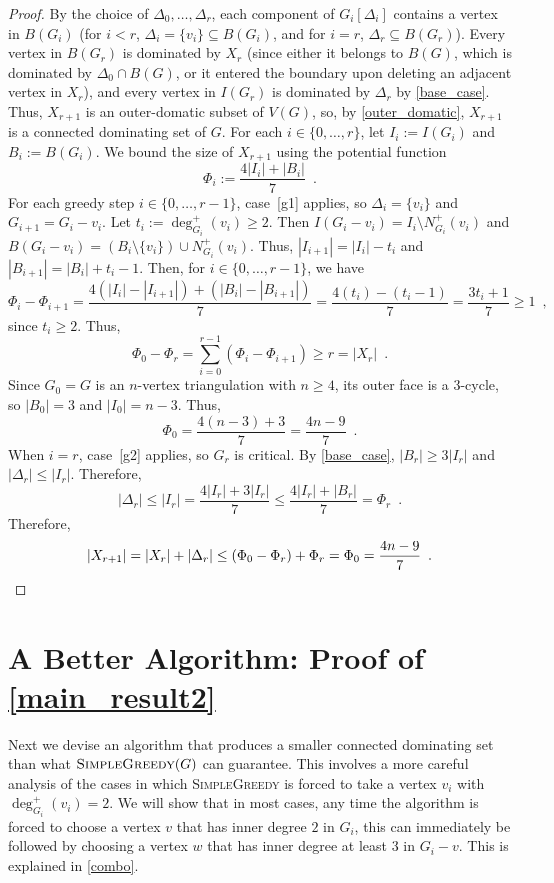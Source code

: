 \documentclass{patmorin}
\begin{document}
\begin{proof}
By the choice of $\Delta_0,\ldots,\Delta_{r}$, each component of $G_i[\Delta_i]$ contains a vertex in $B(G_i)$ (for $i < r$, $\Delta_i=\{v_i\}\subseteq B(G_i)$, and for $i=r$, $\Delta_r\subseteq B(G_r)$). Every vertex in $B(G_r)$ is dominated by $X_r$ (since either it belongs to $B(G)$, which is dominated by $\Delta_0\cap B(G)$, or it entered the boundary upon deleting an adjacent vertex in $X_r$), and every vertex in $I(G_r)$ is dominated by $\Delta_r$ by \cref{base_case}. Thus, $X_{r+1}$ is an outer-domatic subset of $V(G)$, so, by \cref{outer_domatic}, $X_{r+1}$ is a connected dominating set of $G$. For each $i\in\{0,\ldots,r\}$, let $I_i:=I(G_i)$ and $B_i:=B(G_i)$.  We bound the size of $X_{r+1}$ using the potential function
\[
   \Phi_i := \frac{4|I_i|+|B_i|}{7} \enspace .
\]
For each greedy step $i\in\{0,\ldots,r-1\}$, case~[g1] applies, so $\Delta_i=\{v_i\}$ and $G_{i+1}=G_i-v_i$. Let $t_i:=\deg^+_{G_i}(v_i)\ge 2$. Then $I(G_i-v_i)=I_i \setminus N^+_{G_i}(v_i)$ and $B(G_i-v_i) = (B_i \setminus \{v_i\}) \cup N^+_{G_i}(v_i)$.  Thus, $|I_{i+1}|=|I_i|-t_i$ and $|B_{i+1}|=|B_i|+t_i-1$. Then, for $i\in\{0,\ldots,r-1\}$, we have 
\[
   \Phi_i - \Phi_{i+1} = \frac{4(|I_{i}|-|I_{i+1}|)+(|B_{i}|-|B_{i+1}|)}{7}
   = \frac{4(t_i)-(t_i-1)}{7}=\frac{3t_i+1}{7} \ge 1 \enspace ,
\]
since $t_i\ge 2$.
Thus, 
\[
   \Phi_0-\Phi_{r} = \sum_{i=0}^{r-1} (\Phi_i - \Phi_{i+1}) \ge r = |X_r|\enspace .
\]
Since $G_0=G$ is an $n$-vertex triangulation with $n\ge 4$, its outer face is a $3$-cycle, so $|B_0|=3$ and $|I_0|=n-3$. Thus,
\[
  \Phi_0 = \frac{4(n-3)+3}{7} = \frac{4n-9}{7} \enspace .
\]
When $i=r$, case~[g2] applies, so $G_{r}$ is critical. By \cref{base_case}, $|B_{r}|\ge 3|I_{r}|$ and $|\Delta_r|\le |I_r|$. Therefore,
\[
  |\Delta_{r}| \le |I_{r}| = \frac{4|I_{r}|+3|I_{r}|}{7} \le \frac{4|I_{r}|+|B_{r}|}{7} = \Phi_{r} \enspace .
\]
Therefore,
\[
    |X_{r+1}| = |X_r| + |\Delta_r| \le (\Phi_0 - \Phi_r) + \Phi_r = \Phi_0 = \frac{4n-9}{7} \enspace . \qedhere
\]
\end{proof}

\section{A Better Algorithm: Proof of \texorpdfstring{\cref{main_result2}}{the Main Theorem}}
\label{full_result}

Next we devise an algorithm that produces a smaller connected dominating set than what $\textsc{SimpleGreedy}(G)$ can guarantee.  This involves a more careful analysis of the cases in which \textsc{SimpleGreedy} is forced to take a vertex $v_i$ with $\deg^+_{G_i}(v_i)=2$.  We will show that in most cases, any time the algorithm is forced to choose a vertex $v$ that has inner degree $2$ in $G_i$, this can immediately be followed by choosing a vertex $w$ that has inner degree at least $3$ in $G_i-v$.  This is explained in \cref{combo}.
\end{document}
